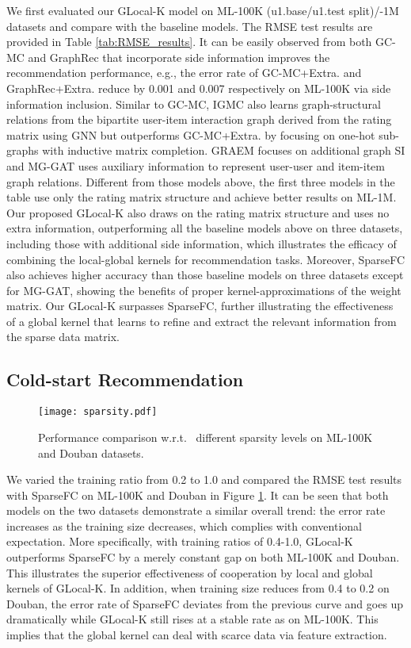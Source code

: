 \documentclass[sigconf]{acmart}
\begin{document}
We first evaluated our GLocal-K model on ML-100K (u1.base/u1.test split)/-1M datasets and compare with the baseline models. The RMSE test results are provided in Table \ref{tab:RMSE_results}. It can be easily observed from both GC-MC and GraphRec that incorporate side information improves the recommendation performance, e.g., the error rate of GC-MC+Extra. and GraphRec+Extra. reduce by 0.001 and 0.007 respectively on ML-100K via side information inclusion. Similar to GC-MC, IGMC also learns graph-structural relations from the bipartite user-item interaction graph derived from the rating matrix using GNN but outperforms GC-MC+Extra. by focusing on one-hot sub-graphs with inductive matrix completion. GRAEM focuses on additional graph SI and MG-GAT uses auxiliary information to represent user-user and item-item graph relations. Different from those models above, the first three models in the table use only the rating matrix structure and achieve better results on ML-1M. Our proposed GLocal-K also draws on the rating matrix structure and uses no extra information, outperforming all the baseline models above on three datasets, including those with additional side information, which illustrates the efficacy of combining the local-global kernels for recommendation tasks. Moreover, SparseFC also achieves higher accuracy than those baseline models on three datasets except for MG-GAT, showing the benefits of proper kernel-approximations of the weight matrix. Our GLocal-K surpasses SparseFC, further illustrating the effectiveness  of a global kernel that learns to refine and extract the relevant information from the sparse data matrix. 

\subsection{Cold-start Recommendation}
\begin{figure}[t]
\centering
\texttt{[image: sparsity.pdf]}
\vspace{-0.35cm}
\caption{Performance comparison w.r.t.~ different sparsity levels on ML-100K and Douban datasets.}
\label{fig:train_size}
\end{figure}
We varied the training ratio from 0.2 to 1.0 and compared the RMSE test results with SparseFC on ML-100K and Douban in Figure \ref{fig:train_size}. It can be seen that both models on the two datasets demonstrate a similar overall trend: the error rate increases as the training size decreases, which complies with conventional expectation. More specifically, with training ratios of 0.4-1.0, GLocal-K outperforms SparseFC by a merely constant gap on both ML-100K and Douban. This illustrates the superior effectiveness of cooperation by local and global kernels of GLocal-K. In addition, when training size reduces from 0.4 to 0.2 on Douban, the error rate of SparseFC deviates from the previous curve and goes up dramatically while GLocal-K still rises at a stable rate as on ML-100K. This implies that the global kernel can deal with scarce data via feature extraction.
\end{document}
